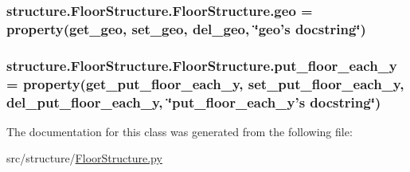 \hypertarget{classstructure_1_1_floor_structure_1_1_floor_structure_a4cdd874c6e1f32ca9b6909a9b174cbde}{
\subsubsection[{geo}]{\setlength{\rightskip}{0pt plus 5cm}structure.\-Floor\-Structure.\-Floor\-Structure.\-geo = property({\bf get\-\_\-geo}, {\bf set\-\_\-geo}, {\bf del\-\_\-geo}, \char`\"{}geo's docstring\char`\"{})\hspace{0.3cm}{\ttfamily [static]}}}\label{classstructure_1_1_floor_structure_1_1_floor_structure_a4cdd874c6e1f32ca9b6909a9b174cbde}
\hypertarget{classstructure_1_1_floor_structure_1_1_floor_structure_a3ba36dbd093432a4891b626473e5bc52}{
\subsubsection[{put\-\_\-floor\-\_\-each\-\_\-y}]{\setlength{\rightskip}{0pt plus 5cm}structure.\-Floor\-Structure.\-Floor\-Structure.\-put\-\_\-floor\-\_\-each\-\_\-y = property({\bf get\-\_\-put\-\_\-floor\-\_\-each\-\_\-y}, {\bf set\-\_\-put\-\_\-floor\-\_\-each\-\_\-y}, {\bf del\-\_\-put\-\_\-floor\-\_\-each\-\_\-y}, \char`\"{}put\-\_\-floor\-\_\-each\-\_\-y's docstring\char`\"{})\hspace{0.3cm}{\ttfamily [static]}}}\label{classstructure_1_1_floor_structure_1_1_floor_structure_a3ba36dbd093432a4891b626473e5bc52}


The documentation for this class was generated from the following file\-:\begin{DoxyCompactItemize}
\item 
src/structure/\hyperlink{_floor_structure_8py}{Floor\-Structure.\-py}\end{DoxyCompactItemize}
